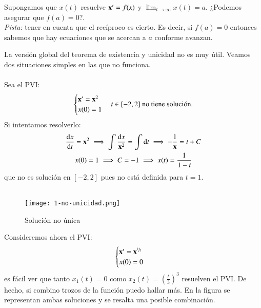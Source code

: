 \begin{th_ex}
    Supongamos que $x(t)$ resuelve $\mathbf{x'} = f(x)$ y $\lim_{t \to \infty} x(t) = a$. ¿Podemos asegurar que $f(a) = 0$?.\\ \textit{Pista:} tener en cuenta que el recíproco es cierto. Es decir, si $f(a) = 0$ entonces sabemos que hay ecuaciones que se acercan a $a$ conforme avanzan.
\end{th_ex}
La versión global del teorema de existencia y unicidad no es muy útil. Veamos dos situaciones simples en las que no funciona.\\\\
Sea el PVI:
$$
    \begin{cases}
        \mathbf{x'} = \mathbf{x}^2\\
        x(0)=1
    \end{cases} t\in [-2,2] \text{ no tiene solución.} \label{eg:no-solution}
$$
Si intentamos resolverlo:
\begin{gather*}
    \frac{\mathrm{d}x}{\mathrm{d}t} = \mathbf{x}^2 \implies \int \frac{\mathrm{d} x}{\mathbf{x}^2} = \int \mathrm{d} t \implies -\frac{1}{\mathbf{x}} = t + C\\
    x(0) = 1 \implies C = -1 \implies x(t) = \frac{1}{1-t}
\end{gather*}
que no es solución en $[-2,2]$ pues no está definida para $t=1$.\\\\

\begin{wrapfigure}[12]{r}{0.6\textwidth}
  \begin{center}
    \texttt{[image: 1-no-unicidad.png]}
  \end{center}
  \caption{Solución no única}\label{img:1-no-unicidad}
\end{wrapfigure}
Consideremos ahora el PVI:
$$
    \begin{cases}
        \mathbf{x'} = \mathbf{x}^{\sfrac{2}{3}}\\
        x(0)=0
    \end{cases}
$$
es fácil ver que tanto $x_1(t) = 0$ como $x_2(t)=(\frac{t}{3})^3$ resuelven el PVI. De hecho, si combino trozos de la función puedo hallar más. En la figura se representan ambas soluciones y se resalta una posible combinación.\\\\

